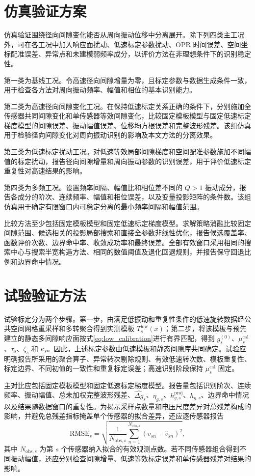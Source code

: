\documentclass[UTF8,12pt,a4paper]{ctexart}
\begin{document}
\section{仿真验证方案}

仿真验证围绕径向间隙变化能否从周向振动位移中分离展开。除下列四类主工况外，可在各工况中加入响应面扰动、低速标定参数扰动、OPR 时间误差、空间坐标配准误差、异常点和未建模弱频率成分，以评价方法在非理想条件下的识别稳定性。

第一类为基线工况。令高速径向间隙增量为零，且标定参数与数据生成条件一致，用于检查各方法对周向振动频率、幅值和相位的基本识别能力。

第二类为高速径向间隙变化工况。在保持低速标定关系正确的条件下，分别施加全传感器共同间隙变化和单传感器等效间隙变化，比较固定模板模型与固定低速标定梯度模型的间隙误差、振动幅值误差、位移均方根误差和完整波形残差。该组仿真用于检验径向间隙变化对周向振动识别的影响及本文方法的分离效果。

第三类为低速标定扰动工况。对低速等效局部间隙梯度和空间配准参数施加不同幅值的标定扰动，报告径向间隙增量和周向振动参数的识别误差，用于评价低速标定重复性对高速结果的影响。

第四类为多频工况。设置频率间隔、幅值比和相位差不同的 $Q>1$ 振动成分，报告各成分的阶次、连续频率、幅值和相位误差，以及变量投影矩阵的条件数。该组仿真用于确定有限窗口内可稳定分离的最小频率间隔和幅值范围。

比较方法至少包括固定模板模型和固定低速标定梯度模型。求解策略消融比较固定间隙范围、候选相关的投影局部搜索和直接全参数非线性优化，报告候选覆盖率、函数评价次数、边界命中率、收敛成功率和最终误差。全部有效窗口采用相同的搜索中心与搜索半宽构造方法、相同的数值阈值及退化回退规则，并报告保守回退比例和边界命中情况。

\section{试验验证方法}

试验标定分为两个步骤。第一步，由满足低振动和重复性条件的低速旋转数据经公共空间网格重采样和多转聚合得到实测模板 $T_s^{\mathrm{low}}(x)$；第二步，将该模板与预先建立的静态多间隙响应面按式\eqref{eq:low_calibration}进行有界匹配，得到 $g_s^{(0)}$、$\mu_s^{\mathrm{cal}}$、$\tau_s$、$\zeta_s$ 和 $\kappa_s$。因此，上述标定参数由低速模板和静态间隙库共同确定。试验应明确报告所采用的聚合算子、异常转次剔除规则、有效低速转次数、模板重复性、标定边界、不同初值的一致性和重复标定误差；高速识别阶段保持 $\mu_s^{\mathrm{cal}}$ 固定。

主对比应包括固定模板模型和固定低速标定梯度模型。报告量包括识别阶次、连续频率、振动幅值、总未加权完整波形残差、$\widehat{\Delta g}_s$、$\eta_{g,s}$、$h_{g,s}^{\mathrm{proj}}$、$h_{g,s}$、边界命中情况以及结果随数据窗口的重复性。为揭示采样点数量和电压尺度差异对总残差构成的影响，并避免总残差指标掩盖单个传感器的拟合差异，还应逐传感器报告
\begin{equation}
\mathrm{RMSE}_s=
\sqrt{\frac{1}{N_{\mathrm{obs},s}}\sum_{n=1}^{N_{\mathrm{obs},s}}
\left(v_{sn}-\widehat v_{sn}\right)^2},
\label{eq:sensor_rmse}
\end{equation}
其中 $N_{\mathrm{obs},s}$ 为第 $s$ 个传感器纳入拟合的有效观测点数。若不同传感器组合得到不同振动幅值，还应分别检查间隙增量、低速等效标定误差和单传感器残差对结果的影响。
\end{document}
